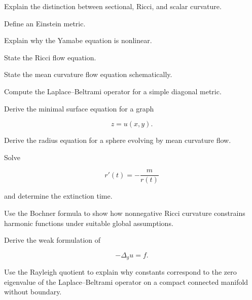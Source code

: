 \begin{exercise}[2]
Explain the distinction between sectional, Ricci, and scalar curvature.
\end{exercise}

\begin{exercise}[2]
Define an Einstein metric.
\end{exercise}

\begin{exercise}[2]
Explain why the Yamabe equation is nonlinear.
\end{exercise}

\begin{exercise}[2]
State the Ricci flow equation.
\end{exercise}

\begin{exercise}[2]
State the mean curvature flow equation schematically.
\end{exercise}

\begin{exercise}[3]
Compute the Laplace--Beltrami operator for a simple diagonal metric.
\end{exercise}

\begin{exercise}[3]
Derive the minimal surface equation for a graph

\[
z=u(x,y).
\]
\end{exercise}

\begin{exercise}[3]
Derive the radius equation for a sphere evolving by mean curvature flow.
\end{exercise}

\begin{exercise}[3]
Solve

\[
r'(t)=-\frac{m}{r(t)}
\]

and determine the extinction time.
\end{exercise}

\begin{exercise}[3]
Use the Bochner formula to show how nonnegative Ricci curvature
constrains harmonic functions under suitable global assumptions.
\end{exercise}

\begin{exercise}[3]
Derive the weak formulation of

\[
-\Delta_g u=f.
\]
\end{exercise}

\begin{exercise}[3]
Use the Rayleigh quotient to explain why constants correspond to the
zero eigenvalue of the Laplace--Beltrami operator on a compact connected
manifold without boundary.
\end{exercise}

